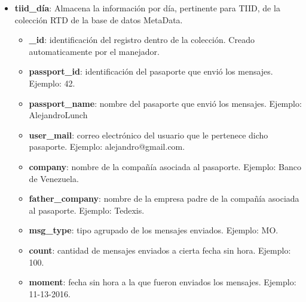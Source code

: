 \begin{itemize}[noitemsep,nolistsep]
\item \textbf{tiid\_día}: Almacena la información por día, pertinente para TIID, de la colección RTD de la base de datos MetaData.
\begin{itemize}[noitemsep,nolistsep]
\item \textbf{\_id}: identificación del registro dentro de la colección. Creado automaticamente por el manejador.
\item \textbf{passport\_id}: identificación del pasaporte que envió los mensajes. Ejemplo: 42.
\item \textbf{passport\_name}: nombre del pasaporte que envió los mensajes. Ejemplo: AlejandroLunch
\item \textbf{user\_mail}: correo electrónico del usuario que le pertenece dicho pasaporte. Ejemplo: alejandro@gmail.com.
\item \textbf{company}: nombre de la compañía asociada al pasaporte. Ejemplo: Banco de Venezuela.
\item \textbf{father\_company}: nombre de la empresa padre de la compañía asociada al pasaporte. Ejemplo: Tedexis.
\item \textbf{msg\_type}: tipo agrupado de los mensajes enviados. Ejemplo: MO.
\item \textbf{count}: cantidad de mensajes enviados a cierta fecha sin hora. Ejemplo: 100.
\item \textbf{moment}: fecha sin hora a la que fueron enviados los mensajes. Ejemplo: 11-13-2016.
\end{itemize} 
\end{itemize}

